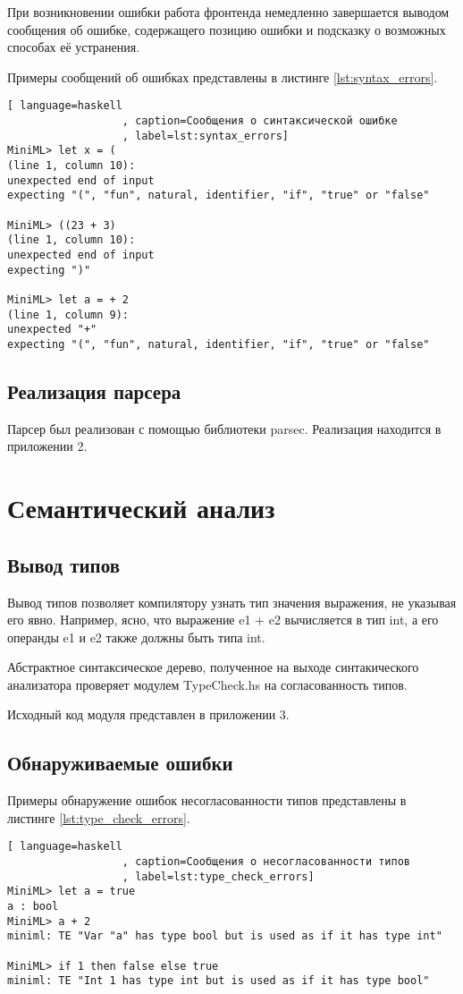 \documentclass[a4paper,12pt]{article}
\numberwithin{equation}{section}
\begin{document}
При возникновении ошибки работа фронтенда немедленно завершается
выводом сообщения об ошибке, содержащего позицию ошибки и подсказку о
возможных способах её устранения.

Примеры сообщений об ошибках представлены в листинге \ref{lst:syntax_errors}.

\begin{lstlisting}[ language=haskell
                  , caption=Сообщения о синтаксической ошибке
                  , label=lst:syntax_errors]
MiniML> let x = (
(line 1, column 10):
unexpected end of input
expecting "(", "fun", natural, identifier, "if", "true" or "false"

MiniML> ((23 + 3) 
(line 1, column 10):
unexpected end of input
expecting ")"

MiniML> let a = + 2
(line 1, column 9):
unexpected "+"
expecting "(", "fun", natural, identifier, "if", "true" or "false"
\end{lstlisting}

\subsection{Реализация парсера}
Парсер был реализован с помощью библиотеки parsec. Реализация находится
в приложении 2.

\section{Семантический анализ}
\subsection{Вывод типов}
Вывод типов позволяет компилятору узнать тип значения выражения, не
указывая его явно. Например, ясно, что выражение e1 + e2 вычисляется
в тип int, а его операнды e1 и e2 также должны быть типа int.

Абстрактное синтаксическое дерево, полученное на выходе синтакического
анализатора проверяет модулем TypeCheck.hs на согласованность типов.

Исходный код модуля представлен в приложении 3.

\subsection{Обнаруживаемые ошибки}
Примеры обнаружение ошибок несогласованности типов представлены
в листинге \ref{lst:type_check_errors}.

\begin{lstlisting}[ language=haskell
                  , caption=Сообщения о несогласованности типов
                  , label=lst:type_check_errors]
MiniML> let a = true
a : bool
MiniML> a + 2
miniml: TE "Var "a" has type bool but is used as if it has type int"

MiniML> if 1 then false else true
miniml: TE "Int 1 has type int but is used as if it has type bool"
\end{lstlisting}
\end{document}
